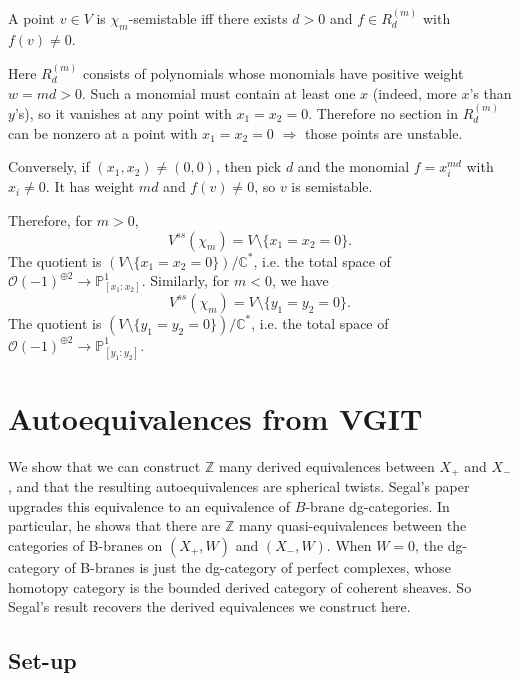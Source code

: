 \documentclass[12pt]{article}
\begin{document}
A point $v\in V$ is $\chi_m$-semistable iff there exists $d>0$ and $f\in R^{(m)}_d$ with $f(v)\ne 0$.

Here $R^{(m)}_d$ consists of polynomials whose monomials have positive weight $w=md>0$. Such a monomial must contain at least one $x$ (indeed, more $x$'s than $y$'s), so it vanishes at any point with $x_1=x_2=0$. Therefore no section in $R^{(m)}_d$ can be nonzero at a point with $x_1=x_2=0$ $\Rightarrow$ those points are unstable.

Conversely, if $(x_1,x_2)\neq(0,0)$, then pick $d$ and the monomial
$f=x_i^{md}$ with $x_i\neq 0$. It has weight $md$ and $f(v)\neq 0$, so $v$ is semistable.

Therefore, for $m>0$,
\[
  V^{ss}(\chi_m)=V\setminus\{x_1=x_2=0\}.
\]
The quotient is $(V\setminus\{x_1=x_2=0\})/\mathbb{C}^*$, i.e. the total space of $\mathcal{O}(-1)^{\oplus 2}\to\mathbb{P}^1_{[x_1:x_2]}$. Similarly, for $m<0$, we have
\[
  V^{ss}(\chi_m)=V\setminus\{y_1=y_2=0\}.
\]
The quotient is $(V\setminus\{y_1=y_2=0\})/\mathbb{C}^*$, i.e. the total space of $\mathcal{O}(-1)^{\oplus 2}\to\mathbb{P}^1_{[y_1:y_2]}$.

\section{Autoequivalences from VGIT}
We show that we can construct $\mathbb{Z}$ many derived equivalences between $X_+$ and $X_-$, and that the resulting autoequivalences are spherical twists. Segal's paper upgrades this equivalence to an equivalence of $B$-brane dg-categories. In particular, he shows that there are $\mathbb{Z}$ many quasi-equivalences between the categories of B-branes on $(X_+, W)$ and $(X_-, W)$. When $W=0$, the dg-category of B-branes is just the dg-category of perfect complexes, whose homotopy category is the bounded derived category of coherent sheaves. So Segal's result recovers the derived equivalences we construct here.




\subsection{Set-up}
\end{document}
